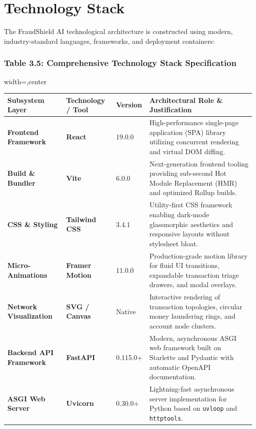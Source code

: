 \documentclass[12pt,a4paper,oneside]{report}
\begin{document}
\section{Technology Stack}

The FraudShield AI technological architecture is constructed using modern, industry-standard languages, frameworks, and deployment containers:


\subsubsection{Table 3.5: Comprehensive Technology Stack Specification}

\begin{table}[H]
\centering
\footnotesize
\begin{adjustbox}{width=\textwidth,center}
\begin{tabular}{| l | l | l | l |}
\hline
\rowcolor{tableheader} \textbf{Subsystem Layer} & \textbf{Technology / Tool} & \textbf{Version} & \textbf{Architectural Role \& Justification} \\ \hline
\textbf{Frontend Framework} & \textbf{React} & 19.0.0 & High-performance single-page application (SPA) library utilizing concurrent rendering and virtual DOM diffing. \\ \hline
\rowcolor{tablealt} \textbf{Build \& Bundler} & \textbf{Vite} & 6.0.0 & Next-generation frontend tooling providing sub-second Hot Module Replacement (HMR) and optimized Rollup builds. \\ \hline
\textbf{CSS \& Styling} & \textbf{Tailwind CSS} & 3.4.1 & Utility-first CSS framework enabling dark-mode glassmorphic aesthetics and responsive layouts without stylesheet bloat. \\ \hline
\rowcolor{tablealt} \textbf{Micro-Animations} & \textbf{Framer Motion} & 11.0.0 & Production-grade motion library for fluid UI transitions, expandable transaction triage drawers, and modal overlays. \\ \hline
\textbf{Network Visualization} & \textbf{SVG / Canvas} & Native & Interactive rendering of transaction topologies, circular money laundering rings, and account node clusters. \\ \hline
\rowcolor{tablealt} \textbf{Backend API Framework} & \textbf{FastAPI} & 0.115.0+ & Modern, asynchronous ASGI web framework built on Starlette and Pydantic with automatic OpenAPI documentation. \\ \hline
\textbf{ASGI Web Server} & \textbf{Uvicorn} & 0.30.0+ & Lightning-fast asynchronous server implementation for Python based on \texttt{uvloop} and \texttt{httptools}. \\ \hline

\end{tabular}
\end{adjustbox}
\end{table}
\end{document}

